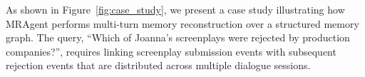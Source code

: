 \documentclass{llmxive}
\begin{document}















As shown in Figure~\ref{fig:case_study}, we present a case study illustrating how
MRAgent performs multi-turn memory reconstruction over a structured memory
graph. 
The query, ``Which of Joanna’s screenplays were rejected by production
companies?'', requires linking screenplay submission events with subsequent
rejection events that are distributed across multiple dialogue sessions.
\end{document}
